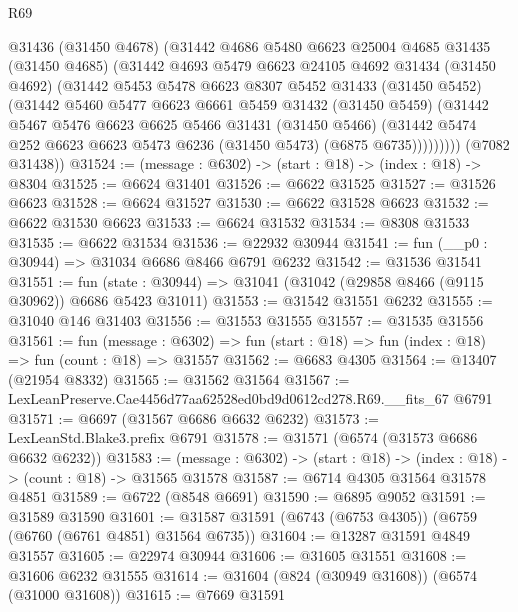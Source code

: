 \begin{lexlean}{R69}
\begin{coremodule}
{          @31436
          (@31450 @4678)
          (@31442
            @4686
            @5480
            @6623
            @25004
            @4685
            @31435
            (@31450 @4685)
            (@31442
              @4693
              @5479
              @6623
              @24105
              @4692
              @31434
              (@31450 @4692)
              (@31442
                @5453
                @5478
                @6623
                @8307
                @5452
                @31433
                (@31450 @5452)
                (@31442
                  @5460
                  @5477
                  @6623
                  @6661
                  @5459
                  @31432
                  (@31450 @5459)
                  (@31442
                    @5467
                    @5476
                    @6623
                    @6625
                    @5466
                    @31431
                    (@31450 @5466)
                    (@31442 @5474 @252 @6623 @6623 @5473 @6236 (@31450 @5473) (@6875 @6735)))))))))
      (@7082 @31438))
@31524 := (message : @6302) -> (start : @18) -> (index : @18) -> @8304
@31525 := @6624 @31401
@31526 := @6622 @31525
@31527 := @31526 @6623
@31528 := @6624 @31527
@31530 := @6622 @31528 @6623
@31532 := @6622 @31530 @6623
@31533 := @6624 @31532
@31534 := @8308 @31533
@31535 := @6622 @31534
@31536 := @22932 @30944
@31541 := fun (__p0 : @30944) => @31034 @6686 @8466 @6791 @6232
@31542 := @31536 @31541
@31551 := fun (state : @30944) => @31041 (@31042 (@29858 @8466 (@9115 @30962)) @6686 @5423 @31011)
@31553 := @31542 @31551 @6232
@31555 := @31040 @146 @31403
@31556 := @31553 @31555
@31557 := @31535 @31556
@31561 := fun (message : @6302) =>
  fun (start : @18) => fun (index : @18) => fun (count : @18) => @31557
@31562 := @6683 @4305
@31564 := @13407 (@21954 @8332)
@31565 := @31562 @31564
@31567 := LexLeanPreserve.Cae4456d77aa62528ed0bd9d0612cd278.R69.__fits_67 @6791
@31571 := @6697 (@31567 @6686 @6632 @6232)
@31573 := LexLeanStd.Blake3.prefix @6791
@31578 := @31571 (@6574 (@31573 @6686 @6632 @6232))
@31583 := (message : @6302) -> (start : @18) -> (index : @18) -> (count : @18) -> @31565 @31578
@31587 := @6714 @4305 @31564 @31578 @4851
@31589 := @6722 (@8548 @6691)
@31590 := @6895 @9052
@31591 := @31589 @31590
@31601 := @31587 @31591 (@6743 (@6753 @4305)) (@6759 (@6760 (@6761 @4851) @31564 @6735))
@31604 := @13287 @31591 @4849 @31557
@31605 := @22974 @30944
@31606 := @31605 @31551
@31608 := @31606 @6232 @31555
@31614 := @31604 (@824 (@30949 @31608)) (@6574 (@31000 @31608))
@31615 := @7669 @31591
}
\end{coremodule}
\end{lexlean}
